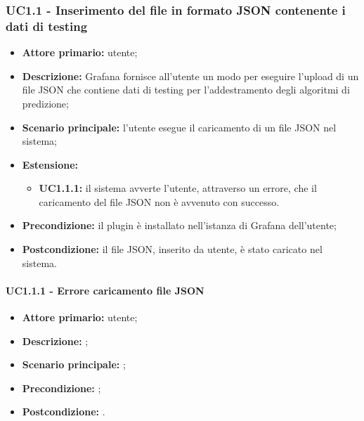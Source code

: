 \documentclass{article}
\begin{document}
	\subsubsection{UC1.1 - Inserimento del file in formato JSON contenente i dati di testing}
	\begin{itemize}
		\item \textbf{Attore primario:} utente;
		\item \textbf{Descrizione:} Grafana fornisce all'utente un modo per eseguire l'upload di un file JSON che contiene dati di testing per l'addestramento degli algoritmi di predizione;
		\item \textbf{Scenario principale:} l'utente esegue il caricamento di un file JSON nel sistema;
		\item \textbf{Estensione:}
			\begin{itemize}
				\item \textbf{UC1.1.1:} il sistema avverte l'utente, attraverso un errore, che il caricamento del file JSON non è avvenuto con successo.
			\end{itemize}
		\item \textbf{Precondizione:} il plugin è installato nell'istanza di Grafana dell'utente;
		\item \textbf{Postcondizione:} il file JSON, inserito da utente, è stato caricato nel sistema.
	\end{itemize}

	\paragraph{UC1.1.1 - Errore caricamento file JSON}
	\begin{itemize}
		\item \textbf{Attore primario:} utente;
		\item \textbf{Descrizione:} ;
		\item \textbf{Scenario principale:} ;
		\item \textbf{Precondizione:} ;
		\item \textbf{Postcondizione:} .
	\end{itemize}
\end{document}
